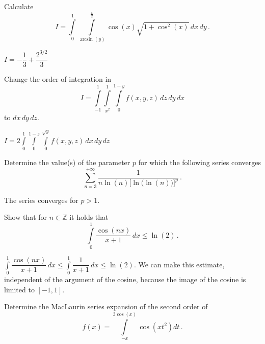 \begin{Exercise} %
Calculate
$$
I = \int\limits_0^1\int\limits_{\arcsin(y)}^{\frac{\pi}{2}}\cos(x)\sqrt{1+\cos^2(x)}\,dx\,dy\,.
$$
\end{Exercise} 

\begin{Answer}\phantom{}
$I = -\dfrac{1}{3} + \dfrac{2^{3/2}}{3}$
\end{Answer}



\begin{Exercise} %
Change the order of integration in
$$
I = \int\limits_{-1}^1\int\limits_{x^2}^1\int\limits_0^{1-y}f(x,y,z)\, dz\,dy\,dx
$$
to $dx\,dy\,dz$.
\end{Exercise}

\begin{Answer}\phantom{}
$I = 2 \displaystyle\int\limits_{0}^1\int\limits_{0}^{1-z}\int\limits_0^{\sqrt{y}}f(x,y,z)\, dx\,dy\,dz$
\end{Answer}


\begin{Exercise} %
Determine the value(s) of the parameter $p$ for which the following series converges
$$
\sum\limits_{n=3}^{+\infty}\dfrac{1}{n\ln(n)\Big[\ln\big(\ln(n)\big)\Big]^p}\,.
$$
\end{Exercise}

\begin{Answer}\phantom{}
The series converges for $p > 1$. 
\end{Answer}


\begin{Exercise} %
Show that for $n\in\mathbb{Z}$ it holds that
$$
\int\limits_{0}^{1}\dfrac{\cos(nx)}{x+1} \, dx\leq\ln(2)\,.
$$
\end{Exercise}

\begin{Answer}\phantom{}
$\displaystyle \int\limits_{0}^{1}\dfrac{\cos(nx)}{x+1} \, dx \leq \int\limits_{0}^{1}\dfrac{1}{x+1} \, dx   \leq\ln(2)$. We can make this estimate, independent of the argument of the cosine, because the image of the cosine is limited to $[-1,1]$.
\end{Answer}

\begin{Exercise} %
Determine the MacLaurin series expansion of the second order of
$$
f(x)=\int\limits_{-x}^{3\cos(x)}\cos\left(xt^2\right)dt\,.
$$
\end{Exercise}

